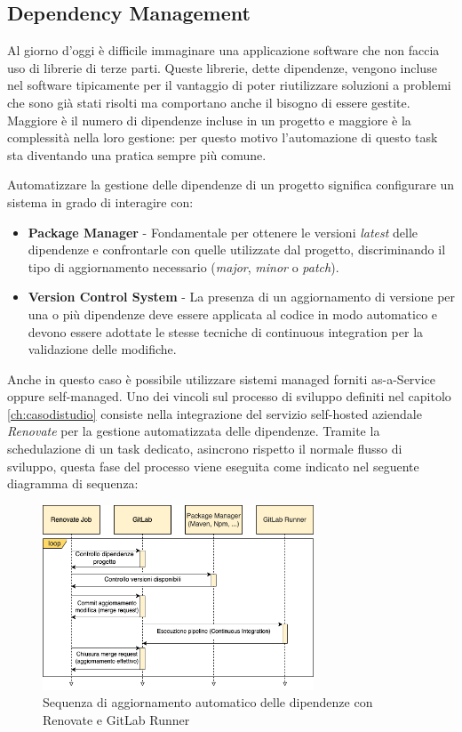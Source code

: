\subsection{Dependency Management}
Al giorno d'oggi è difficile immaginare una applicazione software che non faccia uso di librerie di terze parti. Queste librerie, dette dipendenze, vengono incluse nel software tipicamente per il vantaggio di poter riutilizzare soluzioni a problemi che sono già stati risolti ma comportano anche il bisogno di essere gestite. Maggiore è il numero di dipendenze incluse in un progetto e maggiore è la complessità nella loro gestione: per questo motivo l’automazione di questo task sta diventando una pratica sempre più comune.

Automatizzare la gestione delle dipendenze di un progetto significa configurare un sistema in grado di interagire con:

\begin{itemize}
    \item \textbf{Package Manager} - Fondamentale per ottenere le versioni \textit{latest} delle dipendenze e confrontarle con quelle utilizzate dal progetto, discriminando il tipo di aggiornamento necessario (\textit{major}, \textit{minor} o \textit{patch}).
    \item \textbf{Version Control System} - La presenza di un aggiornamento di versione per una o più dipendenze deve essere applicata al codice in modo automatico e devono essere adottate le stesse tecniche di continuous integration per la validazione delle modifiche.
\end{itemize}

Anche in questo caso è possibile utilizzare sistemi managed forniti as-a-Service oppure self-managed. Uno dei vincoli sul processo di sviluppo definiti nel capitolo \ref{ch:casodistudio} consiste nella integrazione del servizio self-hosted aziendale \textit{Renovate} per la gestione automatizzata delle dipendenze. Tramite la schedulazione di un task dedicato, asincrono rispetto il normale flusso di sviluppo, questa fase del processo viene eseguita come indicato nel seguente diagramma di sequenza:

\begin{figure}[H]
    \centering
    \includegraphics[width=0.72\textwidth]{img/renovate-uml-sequenza.png}
    \caption{Sequenza di aggiornamento automatico delle dipendenze con Renovate e GitLab Runner}
    \label{renovaflow}
\end{figure}

